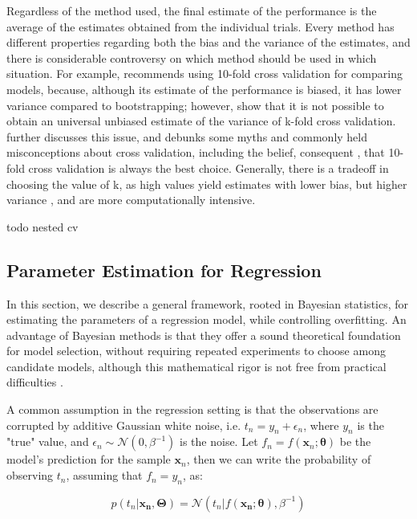 \documentclass[a4paper]{book}
\begin{document}
Regardless of the method used, the final estimate of the performance is the average of the estimates obtained from the individual trials. Every method has different properties regarding both the bias and the variance of the estimates, and there is considerable controversy on which method should be used in which situation. For example, \cite{cv_bootstrap} recommends using 10-fold cross validation for comparing models, because, although its estimate of the performance is biased, it has lower variance compared to bootstrapping; however, \cite{no_unbiased_cv} show that it is not possible to obtain an universal unbiased estimate of the variance of k-fold cross validation. \cite{cvmyths} further discusses this issue, and debunks some myths and commonly held misconceptions about cross validation, including the belief, consequent \cite{cv_bootstrap}, that 10-fold cross validation is always the best choice. Generally, there is a tradeoff in choosing the value of k, as high values yield estimates with lower bias, but higher variance \citep{cv_survey}, and are more computationally intensive.

todo nested cv \cite{nested_cv}

\subsection{Parameter Estimation for Regression}
\label{sec:regression_fit}

In this section, we describe a general framework, rooted in Bayesian statistics, for estimating the parameters of a regression model, while controlling overfitting. An advantage of Bayesian methods is that they offer a sound theoretical foundation for model selection, without requiring repeated experiments to choose among candidate models, although this mathematical rigor is not free from practical difficulties \citep{bayesian_model_selection, practical_bayesian_model_selection}.

A common assumption in the regression setting is that the observations are corrupted by additive Gaussian white noise, i.e. $t_n=y_n+\epsilon_n$, where $y_n$ is the "true" value, and $\epsilon_n\sim\mathcal{N}(0,\beta^{-1})$ is the noise. Let $f_n=f(\bm x_n;\bm{\theta})$ be the model's prediction for the sample $\bm x_n$, then we can write the probability of observing $t_n$, assuming that $f_n=y_n$, as:

\begin{equation}
\label{eq:model_pred_distrib}
p(t_n\vert \bm{x_n},\bm\Theta)=\mathcal{N}(t_n\vert f(\bm{x_n};\bm\theta),\beta^{-1})
\end{equation}
\end{document}
